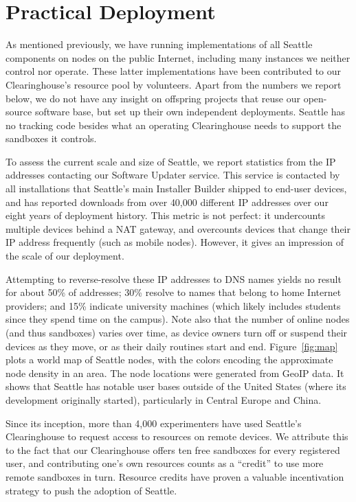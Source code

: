 \section{Practical Deployment}\label{sec-deployment}

As mentioned previously, we have running implementations of all
Seattle components on nodes on the public Internet, including
many instances we neither control nor operate. These latter
implementations have been
contributed to our Clearinghouse's resource pool by volunteers.
Apart from the numbers we report below, we do not have any
insight on offspring projects that reuse our open-source software
base, but set up their own independent deployments.
Seattle has no tracking code besides what an operating Clearinghouse
needs to support the sandboxes it controls.

To assess the current scale and size of Seattle, we report
statistics from the \gls{IP} addresses contacting our Software
Updater service. This service is contacted
by all installations that Seattle's main Installer Builder shipped
to end-user devices, and has reported downloads from over 40,000
different \gls{IP} addresses over our eight years of deployment history.
This metric is not perfect: it undercounts multiple devices behind
a \gls{NAT} gateway, and overcounts devices that change their
\gls{IP} address frequently (such as mobile nodes). However, it
gives an impression of the scale of our deployment.

Attempting to reverse-resolve these \gls{IP} addresses to \gls{DNS}
names yields no result for about 50\% of addresses; 30\% resolve to
names that belong
to home Internet providers; and 15\% indicate
university machines (which likely includes students since they
spend time on the campus). Note also that the number of online
nodes (and thus sandboxes) varies over time, as device owners
turn off or suspend their devices as they move, or as their daily
routines start and end.
Figure~\ref{fig:map} plots a world map of Seattle nodes, with the
colors encoding the approximate node density in an area.
The node locations were generated from GeoIP data.
It shows that Seattle has notable user bases outside of the
United States (where its development originally started),
particularly in Central Europe and China.

Since its inception,
more than 4,000 experimenters have used Seattle's Clearinghouse
to request access to resources on remote devices. We attribute this
to the fact that our Clearinghouse offers ten free sandboxes for
every registered user, and contributing one's own resources counts
as a ``credit'' to use more remote sandboxes in turn.
Resource credits have proven a valuable incentivation strategy
to push the adoption of Seattle.

